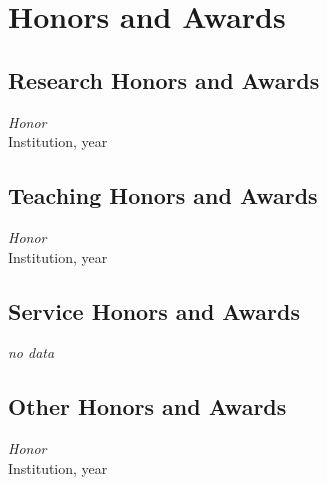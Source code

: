 \section{Honors and Awards}
\label{sec:honors}


\subsection{Research Honors and Awards}
\label{subsec:mylabel4}

\begin{numerate}
    \item   \textsl{Honor}\\ Institution, \mbox{year}
\end{numerate}

\subsection{Teaching Honors and Awards}
\label{subsec:tawards}
\begin{numerate} 
    \item   \textsl{Honor}\\ Institution, \mbox{year}
\end{numerate}

\subsection{Service Honors and Awards}
\label{subsec:sawards}
\begin{numerate}
    \item[] \textsl{no data}
\end{numerate}



\subsection{Other Honors and Awards}
\begin{numerate}
    \item   \textsl{Honor}\\ Institution, \mbox{year}
\end{numerate}



